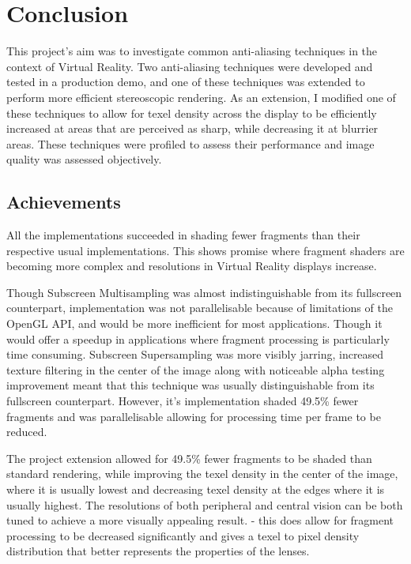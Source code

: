 \documentclass[12pt,a4paper,twoside,openright]{report}
\begin{document}
\chapter{Conclusion}

This project's aim was to investigate common anti-aliasing techniques in the context of Virtual Reality. Two anti-aliasing techniques were developed and tested in a production demo, and one of these techniques was extended to perform more efficient stereoscopic rendering. As an extension, I modified one of these techniques to allow for texel density across the display to be efficiently increased at areas that are perceived as sharp, while decreasing it at blurrier areas. These techniques were profiled to assess their performance and image quality was assessed objectively.  

\section{Achievements}

All the implementations succeeded in shading fewer fragments than their respective usual implementations.
This shows promise where fragment shaders are becoming more complex and resolutions in Virtual Reality displays increase. \par

Though Subscreen Multisampling was almost indistinguishable from its fullscreen counterpart, implementation was not parallelisable because of limitations of the OpenGL API, and would be more inefficient for most applications. Though it would offer a speedup in applications where fragment processing is particularly time consuming.
Subscreen Supersampling was more visibly jarring, increased texture filtering in the center of the image along with noticeable alpha testing improvement meant that this technique was usually distinguishable from its fullscreen counterpart.
However, it's implementation shaded 49.5\% fewer fragments and was parallelisable allowing for processing time per frame to be reduced. \par

The project extension allowed for 49.5\% fewer fragments to be shaded than standard rendering, while improving the texel density in the center of the image, where it is usually lowest and decreasing texel density at the edges where it is usually highest. The resolutions of both peripheral and central vision can be both tuned to achieve a more visually appealing result. - this does allow for fragment processing to be decreased significantly and gives a texel to pixel density distribution that better represents the properties of the lenses. \par
\end{document}
